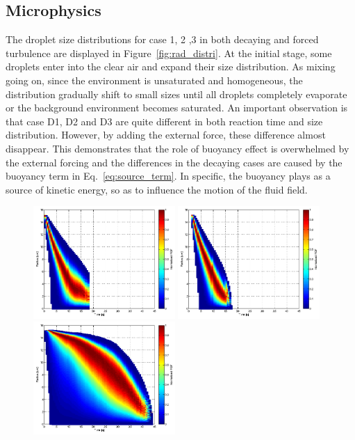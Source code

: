 \documentclass[draft,jgrga]{AGUTeX}
\newcommand{\Eq}[1]{Eq.~\eqref{#1}} \newcommand{\Fig}[1]{Figure~\ref{#1}}
\begin{document}
\begin{article}
\subsection{Microphysics}
The droplet size distributions for case 1, 2 ,3 in both decaying and forced turbulence are displayed in \Fig{fig:rad_distri}. At the initial stage, some droplets enter into the clear air and expand their size distribution. As mixing going on, since the environment is unsaturated and homogeneous, the distribution gradually shift to small sizes until all droplets completely evaporate or the background environment becomes saturated. 
An important observation is that case D1, D2 and D3 are quite different in both reaction time and size distribution. However, by adding the external force, these difference almost disappear. This demonstrates that the role of buoyancy effect is overwhelmed by the external forcing and the differences in the decaying cases are caused by the buoyancy term in \Eq{eq:source_term}. In specific, the buoyancy plays as a source of kinetic energy, so as to influence the motion of the fluid field.
\begin{figure}[H]\centering
\includegraphics[width=0.48\textwidth]{Figures/pdf_radius_d1}
\includegraphics[width=0.48\textwidth]{Figures/pdf_radius_f1}\\
\includegraphics[width=0.48\textwidth]{Figures/pdf_radius_d2}

\end{figure}
\end{article}
\end{document}
